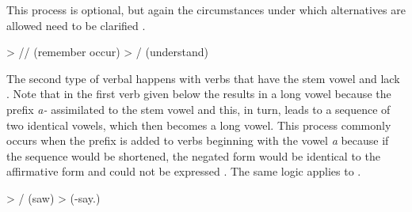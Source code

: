 This process is optional, but again the circumstances under which alternatives are allowed need to be clarified .
%
\begin{exe}
	\ex	\label{ex:does not understand phon}
	\begin{xlist}
		\ex	{} > \slash{}\slash{}  (remember occur)  
		\ex	{} > \slash{} \newline\hspace*{1em}(understand)
	\end{xlist}
\end{exe}
%

The second type of verbal  happens with verbs that have the stem vowel  and lack   . Note that in the first verb given below the  results in a long vowel because the  prefix \textit{a-} assimilated to the stem vowel and this, in turn, leads to a sequence of two identical vowels, which then becomes a long vowel. This process commonly occurs when the  prefix is added to verbs beginning with the vowel \textit{a} because if the sequence would be shortened, the negated form would be identical to the affirmative form and  could not be expressed . The same logic applies to  .
%
\begin{exe}
	\label{ex:a e e phon}
	\begin{xlist}
		\ex	\label{ex:sawPHON}  > \slash{} (saw\tsc{.pfv-pret})
		\ex	{} >  (-say.\tsc{ipfv-icvb})
	\end{xlist}
\end{exe}

